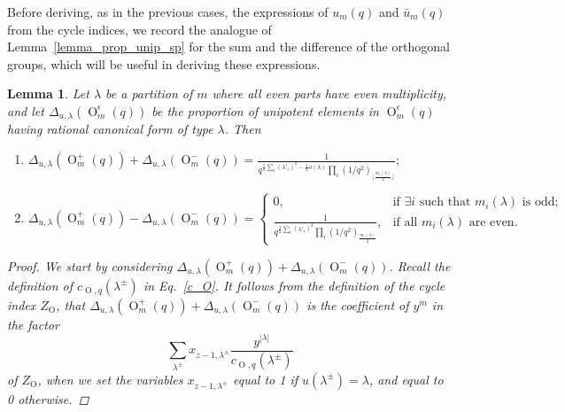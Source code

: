 \documentclass[a4paper, 12pt, oneside]{amsart}
\newtheorem{lemma}[prop]{Lemma}
\theoremstyle{definition}
\DeclareMathOperator{\Or}{O}
\begin{document}
Before deriving, as in the previous cases, the expressions of $u_m(q)$ and 
$\bar u_m(q)$ from the cycle indices, we record the analogue of Lemma~\ref{lemma_prop_unip_sp} for the sum and the difference of the orthogonal groups, which will be useful in deriving these expressions.

\begin{lemma}
\label{unip_orth_lambda}
Let $\lambda$ be a partition of $m$ where all even parts have even multiplicity, and let
$\Delta_{u,\lambda}(\Or^{\epsilon}_m(q))$ be the proportion of unipotent elements in $\Or^{\epsilon}_m(q)$ having rational canonical form of type $\lambda$. Then
\begin{enumerate}[label=\roman*.]
    \item 
$\displaystyle \Delta_{u,\lambda}(\Or^{+}_m(q))+\Delta_{u,\lambda}(\Or^{-}_m(q))=\frac{1}{q^{\frac{1}{2}\sum_i (\lambda'_i)^2-\frac{1}{2}o(\lambda)}\prod_i(1/q^2)_{\lfloor\frac{m_i(\lambda)}{2}\rfloor}};$
\item 
$\displaystyle
\Delta_{u,\lambda}(\Or^{+}_m(q))-\Delta_{u,\lambda}(\Or^{-}_m(q))=\begin{cases}0, &\text{if }\exists i \text{ such that }m_i(\lambda) \text{ is odd;} \\
\frac{1}{q^{\frac{1}{2}\sum_i (\lambda'_i)^2}\prod_i(1/q^2)_{\frac{m_i(\lambda)}{2}}}, &\text{if all }m_i(\lambda) \text{ are even}.\end{cases}$
\end{enumerate}
\begin{proof}
We start by considering $\Delta_{u,\lambda}(\Or^{+}_m(q))+\Delta_{u,\lambda}(\Or^{-}_m(q))$.
     Recall the definition of $c_{\Or,q}(\lambda^{\pm})$ in Eq.~\eqref{c_O}. 
   It follows from the definition of the cycle index $Z_{\Or}$, that $\Delta_{u,\lambda}(\Or^{+}_m(q))+\Delta_{u,\lambda}(\Or^{-}_m(q))$ is the coefficient of $y^m$ in the factor
$$\sum_{\lambda^{\pm}}x_{z-1,\lambda^{\pm}}\frac{y^{|\lambda|}}{c_{\Or,q}(\lambda^{\pm})}$$ of
   $Z_{\Or}$, when we set the variables $x_{z-1,\lambda^{\pm}}$ equal to 1 if $u(\lambda^{\pm})=\lambda$, and equal to 0 otherwise. 
   

\end{proof}
\end{lemma}
\end{document}
